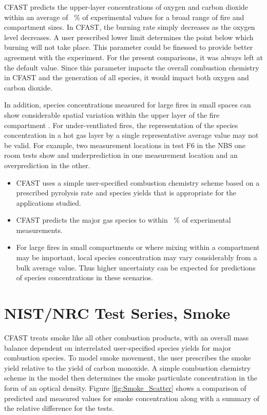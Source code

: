 CFAST predicts the upper-layer concentrations of oxygen and carbon dioxide within an average of \Speciesavg~\% of experimental values for a broad range of fire and compartment sizes.  In CFAST, the burning rate simply decreases as the oxygen level decreases.  A user prescribed lower limit determines the point below which burning will not take place.  This parameter could be finessed to provide better agreement with the experiment.  For the present comparisons, it was always left at the default value. Since this parameter impacts the overall combustion chemistry in CFAST and the generation of all species, it would impact both oxygen and carbon dioxide.

In addition, species concentrations measured for large fires in small spaces can show considerable spatial variation within the upper layer of the fire compartment \cite{Bundy:2007}. For under-ventliated fires, the representation of the species concentration in a hot gas layer by a single representative average value may not be valid. For example, two measurement locations in test F6 in the NBS one room tests show and underprediction in one measurement location and an overprediction in the other.

\begin{itemize}
\item CFAST uses a simple user-specified combustion chemistry scheme based on a prescribed pyrolysis rate and species yields that is appropriate for the applications studied.
\item CFAST predicts the major gas species to within \Speciesavg ~\% of experimental measurements.
\item For large fires in small compartments or where mixing within a compartment may be important, local species concentration may vary considerably from a bulk average value.  Thus higher uncertainty can be expected for predictions of species concentrations in these scenarios.
\end{itemize}

\section{NIST/NRC Test Series, Smoke}

CFAST treats smoke like all other combustion products, with an overall mass balance dependent on interrelated user-specified species yields for major combustion species.  To model smoke movement, the user prescribes the smoke yield relative to the yield of carbon monoxide.  A simple combustion chemistry scheme in the model then determines the smoke particulate concentration in the form of an optical density.  Figure \ref{fig:Smoke_Scatter} shows a comparison of predicted and measured values for smoke concentration along with a summary of the relative difference for the tests.
\label{Smoke Concentration}

